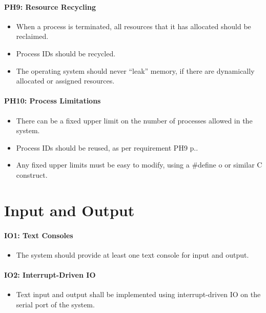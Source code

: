 \paragraph{PH9: Resource Recycling}
\label{pg:ph8}

\begin{itemize}
  \item When a process is terminated, all resources that it has allocated should be reclaimed.
  \item  Process IDs should be recycled.
  \item  The operating system should never ``leak'' memory, if there are dynamically allocated or assigned resources.
\end{itemize}

\paragraph{PH10: Process Limitations}
\label{pg:ph10}

\begin{itemize}
  \item There can be a fixed upper limit on the number of processes allowed in the  system.
  \item  Process IDs should be reused, as per requirement PH9 p.\pageref{pg:ph9}.
  \item  Any fixed upper limits must be easy to modify, using a #define o or similar C construct.
\end{itemize}

\section{Input and Output}
\label{se:input_output}

\paragraph{IO1: Text Consoles}
\label{pg:io1}

\begin{itemize}
  \item The system should provide at least one text console for input and output.
\end{itemize}

\paragraph{IO2: Interrupt-Driven IO}

\begin{itemize}
  \item Text input and output shall be implemented using interrupt-driven IO on the serial port of the system.
\end{itemize}

